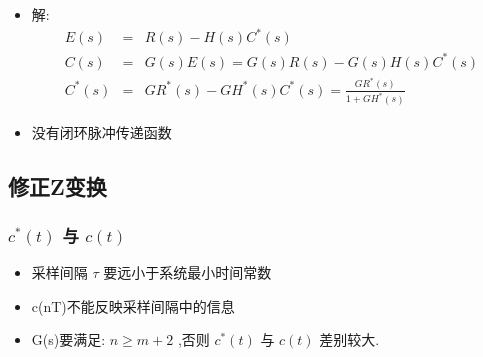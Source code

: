 \documentclass[table]{article}
\begin{document}
\begin{frame}
\begin{itemize}
\item <2->解:
      \begin{eqnarray*}
      E(s) &=& R(s)-H(s)C^*(s)\\
      C(s) & = & G(s)E(s) 
          = G(s)R(s)-G(s)H(s)C^*(s)\\
      C^*(s) &=& GR^*(s)-GH^*(s)C^*(s)
             = \frac{GR^*(s)}{1+GH^*(s)}
      \end{eqnarray*}
\item <3->没有闭环脉冲传递函数
\end{itemize}
\end{frame}
\subsection{修正Z变换}
\label{sec-4-5}
\begin{frame}
\frametitle{$c^*(t)$ 与 $c(t)$}
\label{sec-4-5-1}

\begin{itemize}
\item <2->采样间隔 $\tau$  要远小于系统最小时间常数
\item <3->c(nT)不能反映采样间隔中的信息
\item <4->G(s)要满足:  $n\geq m+2$  ,否则  $c^*(t)$  与  $c(t)$  差别较大.
\end{itemize}
\end{frame}
\end{document}
